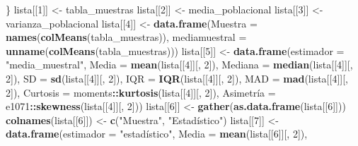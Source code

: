 \documentclass[
]{article}
\newenvironment{Shaded}{\begin{snugshade}}{\end{snugshade}}
\newcommand{\DataTypeTok}[1]{\textcolor[rgb]{0.13,0.29,0.53}{#1}}
\newcommand{\DecValTok}[1]{\textcolor[rgb]{0.00,0.00,0.81}{#1}}
\newcommand{\KeywordTok}[1]{\textcolor[rgb]{0.13,0.29,0.53}{\textbf{#1}}}
\newcommand{\NormalTok}[1]{#1}
\newcommand{\OperatorTok}[1]{\textcolor[rgb]{0.81,0.36,0.00}{\textbf{#1}}}
\newcommand{\StringTok}[1]{\textcolor[rgb]{0.31,0.60,0.02}{#1}}
\begin{document}
\begin{Shaded}
\begin{Highlighting}[]
{{\NormalTok{        \}}
\NormalTok{        lista[[}\DecValTok{1}\NormalTok{]] <-}\StringTok{ }\NormalTok{tabla_muestras}
\NormalTok{        lista[[}\DecValTok{2}\NormalTok{]] <-}\StringTok{ }\NormalTok{media_poblacional}
\NormalTok{        lista[[}\DecValTok{3}\NormalTok{]] <-}\StringTok{ }\NormalTok{varianza_poblacional}
\NormalTok{        lista[[}\DecValTok{4}\NormalTok{]] <-}\StringTok{ }\KeywordTok{data.frame}\NormalTok{(}\DataTypeTok{Muestra =} \KeywordTok{names}\NormalTok{(}\KeywordTok{colMeans}\NormalTok{(tabla_muestras)), }\DataTypeTok{mediamuestral =} \KeywordTok{unname}\NormalTok{(}\KeywordTok{colMeans}\NormalTok{(tabla_muestras))) }
\NormalTok{        lista[[}\DecValTok{5}\NormalTok{]] <-}\StringTok{ }\KeywordTok{data.frame}\NormalTok{(}\DataTypeTok{estimador =} \StringTok{"media_muestral"}\NormalTok{, }
                                 \DataTypeTok{Media =} \KeywordTok{mean}\NormalTok{(lista[[}\DecValTok{4}\NormalTok{]][, }\DecValTok{2}\NormalTok{]),}
                                 \DataTypeTok{Mediana =} \KeywordTok{median}\NormalTok{(lista[[}\DecValTok{4}\NormalTok{]][, }\DecValTok{2}\NormalTok{]),}
                                 \DataTypeTok{SD =} \KeywordTok{sd}\NormalTok{(lista[[}\DecValTok{4}\NormalTok{]][, }\DecValTok{2}\NormalTok{]), }
                                 \DataTypeTok{IQR =} \KeywordTok{IQR}\NormalTok{(lista[[}\DecValTok{4}\NormalTok{]][, }\DecValTok{2}\NormalTok{]), }
                                 \DataTypeTok{MAD =} \KeywordTok{mad}\NormalTok{(lista[[}\DecValTok{4}\NormalTok{]][, }\DecValTok{2}\NormalTok{]), }
                                 \DataTypeTok{Curtosis =}\NormalTok{ moments}\OperatorTok{::}\KeywordTok{kurtosis}\NormalTok{(lista[[}\DecValTok{4}\NormalTok{]][, }\DecValTok{2}\NormalTok{]), }
\NormalTok{                                 Asimetrí}\DataTypeTok{a =}\NormalTok{ e1071}\OperatorTok{::}\KeywordTok{skewness}\NormalTok{(lista[[}\DecValTok{4}\NormalTok{]][, }\DecValTok{2}\NormalTok{]))}
\NormalTok{        lista[[}\DecValTok{6}\NormalTok{]] <-}\StringTok{ }\KeywordTok{gather}\NormalTok{(}\KeywordTok{as.data.frame}\NormalTok{(lista[[}\DecValTok{6}\NormalTok{]])) }
        \KeywordTok{colnames}\NormalTok{(lista[[}\DecValTok{6}\NormalTok{]]) <-}\StringTok{ }\KeywordTok{c}\NormalTok{(}\StringTok{"Muestra"}\NormalTok{, }\StringTok{"Estadístico"}\NormalTok{)}
\NormalTok{        lista[[}\DecValTok{7}\NormalTok{]] <-}\StringTok{ }\KeywordTok{data.frame}\NormalTok{(}\DataTypeTok{estimador =} \StringTok{"estadístico"}\NormalTok{,}
                                 \DataTypeTok{Media =} \KeywordTok{mean}\NormalTok{(lista[[}\DecValTok{6}\NormalTok{]][, }\DecValTok{2}\NormalTok{]),}
}}
\end{Highlighting}
\end{Shaded}
\end{document}
